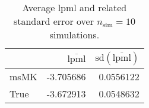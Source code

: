 \begin{table}[H]

\caption{Average lpml and related standard error over $n_{\text{sim}} = 10$ simulations.}
\centering
\begin{tabular}[t]{lrr}
\toprule
  & $\overbar{\text{lpml}}$ & $\text{sd}(\overbar{\text{lpml}})$\\
\midrule
msMK & -3.705686 & 0.0556122\\
True & -3.672913 & 0.0548632\\
\bottomrule
\end{tabular}
\end{table}